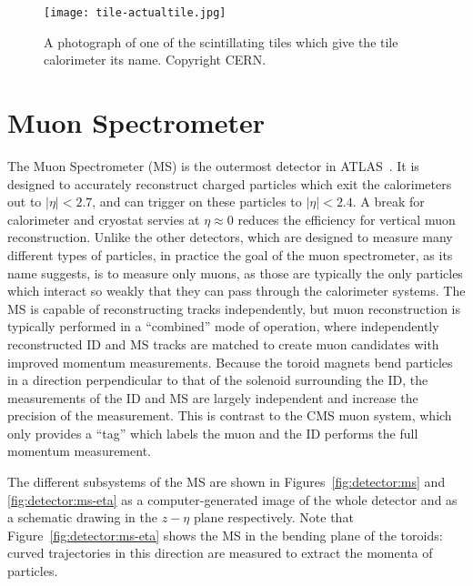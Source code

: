

\begin{figure}
\centering
\texttt{[image: tile-actualtile.jpg]}
\label{fig:detector:actualtile}
\caption{A photograph of one of the scintillating tiles which give the tile calorimeter its name. Copyright CERN.}
\end{figure}





\section{Muon Spectrometer}

The Muon Spectrometer (MS) is the outermost detector in ATLAS~\cite{ATLASPaper}. It is designed to accurately reconstruct charged particles which exit the calorimeters out to $|\eta| < 2.7$, and can trigger on these particles to $|\eta| < 2.4$. A break for calorimeter and cryostat servies at $\eta \approx 0$ reduces the efficiency for vertical muon reconstruction.  Unlike the other detectors, which are designed to measure many different types of particles, in practice the goal of the muon spectrometer, as its name suggests, is to measure only muons, as those are typically the only particles which interact so weakly that they can pass through the calorimeter systems. The MS is capable of reconstructing tracks independently, but muon reconstruction is typically performed in a ``combined'' mode of operation, where independently reconstructed ID and MS tracks are matched to create muon candidates with improved momentum measurements. Because the toroid magnets bend particles in a direction perpendicular to that of the solenoid surrounding the ID, the measurements of the ID and MS are largely independent and increase the precision of the measurement. This is contrast to the CMS muon system, which only provides a ``tag'' which labels the muon and the ID performs the full momentum measurement.

The different subsystems of the MS are shown in Figures~\ref{fig:detector:ms} and \ref{fig:detector:ms-eta} as a computer-generated image of the whole detector and as a schematic drawing in the $z-\eta$ plane respectively. Note that Figure~\ref{fig:detector:ms-eta} shows the MS in the bending plane of the toroids: curved trajectories in this direction are measured to extract the momenta of particles. 


